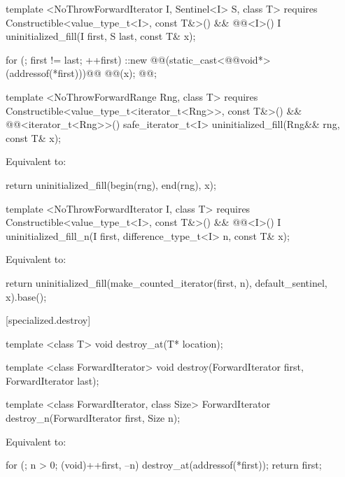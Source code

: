 {\color{addclr}
\begin{codeblock}
template <NoThrowForwardIterator I, Sentinel<I> S, class T>
  requires Constructible<value_type_t<I>, const T&>() &&
           @@<I>()
  I uninitialized_fill(I first, S last, const T& x);
\end{codeblock}
} %

\setcounter{Paras}{0}
\pnum
\effects {}
\begin{codeblock}
        for (; first != last; ++first)
          ::new @@(static_cast<@@void*>(addressof(*first)))@\added{)}@
            @@(x);
        @@;
\end{codeblock}

{\color{addclr}
\begin{codeblock}
template <NoThrowForwardRange Rng, class T>
  requires Constructible<value_type_t<iterator_t<Rng>>, const T&>() &&
            @@<iterator_t<Rng>>()
  safe_iterator_t<I>
  uninitialized_fill(Rng&& rng, const T& x);
\end{codeblock}

\setcounter{Paras}{0}
\pnum
\effects Equivalent to:
\begin{codeblock}
        return uninitialized_fill(begin(rng), end(rng), x);
\end{codeblock}

\begin{codeblock}
template <NoThrowForwardIterator I, class T>
  requires Constructible<value_type_t<I>, const T&>() &&
           @@<I>()
  I uninitialized_fill_n(I first, difference_type_t<I> n, const T& x);
\end{codeblock}

\pnum
\effects Equivalent to:
\begin{codeblock}
        return uninitialized_fill(make_counted_iterator(first, n),
                                  default_sentinel{}, x).base();
\end{codeblock}
} %

[specialized.destroy]{}
{\color{remclr}
\begin{codeblock}
template <class T>
  void destroy_at(T* location);
\end{codeblock}

\begin{codeblock}
template <class ForwardIterator>
  void destroy(ForwardIterator first, ForwardIterator last);
\end{codeblock}

\begin{codeblock}
template <class ForwardIterator, class Size>
  ForwardIterator destroy_n(ForwardIterator first, Size n);
\end{codeblock}

\setcounter{Paras}{2}
\pnum
\effects Equivalent to:
\begin{codeblock}
        for (; n > 0; (void)++first, --n)
          destroy_at(addressof(*first));
        return first;
\end{codeblock}
} %

